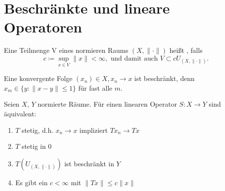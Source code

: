 
\section{Beschr{\"a}nkte und lineare Operatoren}

\begin{definition}
	Eine Teilmenge V eines normieren Raums $(X, \| \cdot \|)$ hei{\ss}t , falls 
	\[ c \coloneqq \sup_{x \in V} \| x \| < \infty, \text{ und damit auch } V \subset c U_{(X, \| \cdot \| )} . \]
\end{definition}


\begin{bemerkung}
	Eine konvergente Folge $(x_{n})	\in X, x_{n} \rightarrow x$ ist beschränkt, denn $x_{m} \in \{ y: \| x - y \| \leq 1 \}$ für fast alle $m$.
\end{bemerkung}


\begin{satz}
	Seien $X$, $Y$ normierte Räume. Für einen linearen Operator $S: X \rightarrow Y$ sind äquivalent:
	\begin{enumerate}[label=\alph*\upshape)]
		\item $T$ stetig, d.h. $x_{n} \rightarrow x$ impliziert $Tx_{n} \rightarrow Tx$
		\item $T$ stetig in 0
		\item $T(U_{(X, \| \cdot \|)})$ ist beschränkt in $Y$
		\item Es gibt ein $c < \infty$ mit $\| Tx \| \leq c \| x \|$
	\end{enumerate}	
\end{satz}

